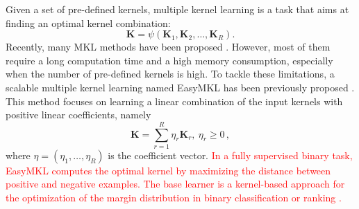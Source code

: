 \documentclass[twocolumn]{bmcart}%
\begin{document}
Given a set of pre-defined kernels, multiple kernel learning is a task that aims at finding an optimal kernel combination: 
\begin{equation}
\textbf{K} = \psi(\textbf{K}_1, \textbf{K}_2,\ldots, \textbf{K}_R) .
\end{equation}
Recently, many MKL methods have been proposed \cite{gonen,wang}. However, most of them require a long computation time and a high memory consumption, especially when the number of pre-defined kernels is high. To tackle these limitations, a scalable multiple kernel learning named EasyMKL has been previously proposed \cite{easymkl}. This method focuses on learning a linear combination of the input kernels with positive linear coefficients, namely
\begin{equation}
\textbf{K} =  \sum_{r=1}^{R} {\eta_r \textbf{K}_r}, \ \eta_r \geq 0 \, ,
\end{equation}
where $\eta=(\eta_{1}, \dots , \eta_{R})$ is the coefficient vector. \textcolor{red}{In a fully supervised binary task, EasyMKL computes the optimal kernel by maximizing the distance between positive and negative examples. The base learner is a kernel-based approach for the optimization of the margin distribution in binary classification or ranking \cite{komd}.}
\end{document}
